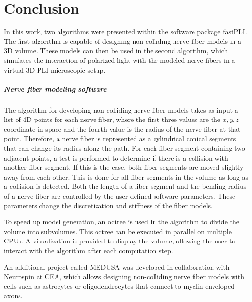 \cleardoublepage
\setcounter{chapter}{10}
\chapter{Conclusion}
\label{sec:conclusion}
%
In this work, two algorithms were presented within the software package \ac{fastPLI}.
The first algorithm is capable of designing non-colliding nerve fiber models in a 3D volume.
These models can then be used in the second algorithm, which simulates the interaction of polarized light with the modeled nerve fibers in a virtual \ac{3D-PLI} microscopic setup.
%
%
%
\paragraph{Nerve fiber modeling software}
%
The algorithm for developing non-colliding nerve fiber models takes as input a list of 4D points for each nerve fiber, where the first three values are the $x,y,z$ coordinate in space and the fourth value is the radius of the nerve fiber at that point.
Therefore, a nerve fiber is represented as a cylindrical conical segments that can change its radius along the path.
For each fiber segment containing two adjacent points, a test is performed to determine if there is a collision with another fiber segment.
If this is the case, both fiber segments are moved slightly away from each other.
This is done for all fiber segments in the volume as long as a collision is detected.
Both the length of a fiber segment and the bending radius of a nerve fiber are controlled by the user-defined software parameters.
These parameters change the discretization and stiffness of the fiber models.
\par
%
To speed up model generation, an octree is used in the algorithm to divide the volume into subvolumes.
This octree can be executed in parallel on multiple \acp{CPU}.
A visualization is provided to display the volume, allowing the user to interact with the algorithm after each computation step.
\par
%
An additional project called \ac{MEDUSA} was developed in collaboration with Neurospin at \ac{CEA}, which allows designing non-colliding nerve fiber models with cells such as astrocytes or oligodendrocytes that connect to myelin-enveloped axons.
%
%
%
